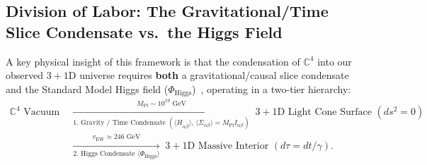 \documentclass[11pt,a4paper]{article}
\begin{document}
\subsection{Division of Labor: The Gravitational/Time Slice Condensate vs.\ the Higgs Field}
A key physical insight of this framework is that the condensation of $\mathbb{C}^4$ into our observed $3+1\text{D}$ universe requires \textbf{both} a gravitational/causal slice condensate and the Standard Model Higgs field ($\Phi_{\text{Higgs}}$)~\cite{Higgs1964}, operating in a two-tier hierarchy:
\begin{equation}
\begin{aligned}
\mathbb{C}^4 \text{ Vacuum} &\;\xrightarrow[\text{1. Gravity / Time Condensate } (\langle H_{\alpha\bar{\beta}}\rangle,\, \langle \Sigma_{\alpha\beta}\rangle = M_{\text{Pl}} I_{\alpha\beta})]{M_{\text{Pl}} \sim 10^{19}\text{ GeV}}\; 3+1\text{D Light Cone Surface } (ds^2 = 0) \\
&\;\xrightarrow[\text{2. Higgs Condensate } \langle \Phi_{\text{Higgs}} \rangle]{v_{\text{EW}} \approx 246\text{ GeV}}\; 3+1\text{D Massive Interior } (d\tau = dt/\gamma).
\end{aligned}
\end{equation}
\end{document}
